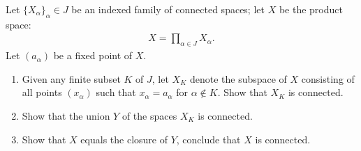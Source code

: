 \documentclass[10pt,twoside,openany]{memoir}
\begin{document}
\begin{problem}[manual-num={23.10}]
    Let $\{X_\alpha\}_\alpha \in J$ be an indexed family of connected spaces; let $X$ be the product space:
        \begin{equation*}
        \begin{split}
            X = \prod_{\alpha \in J}X_\alpha.
        \end{split}
        \end{equation*}
    Let $(a_\alpha)$ be a fixed point of $X$.
    \begin{enumerate}[label = (\alph*),itemsep=1pt,topsep=3pt]
        \item Given any finite subset $K$ of $J$, let $X_K$ denote the subspace of $X$ consisting of all points $(x_\alpha)$ such that $x_\alpha = a_\alpha$ for $\alpha \not\in K$. Show that $X_K$ is connected.
        \item Show that the union $Y$ of the spaces $X_K$ is connected.
        \item Show that $X$ equals the closure of $Y$, conclude that $X$ is connected.
    \end{enumerate}
\end{problem}
\end{document}
